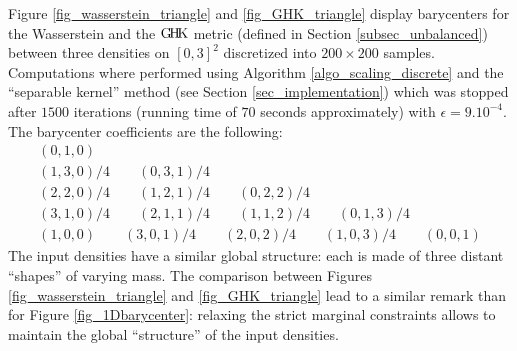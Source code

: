Figure \ref{fig_wasserstein_triangle} and \ref{fig_GHK_triangle} display barycenters for the Wasserstein and the $\operatorname{G\! H\! K}$ metric (defined in Section \ref{subsec_unbalanced}) between three densities on $[0,3]^2$ discretized into $200\times 200$ samples. Computations where performed using Algorithm \ref{algo_scaling_discrete} and the ``separable kernel'' method (see Section \ref{sec_implementation}) which was stopped after $1500$ iterations (running time of $70$ seconds approximately) with $\epsilon=9.10^{-4}$. The barycenter coefficients are the following:
\begin{gather*}
(0,1,0)\\
(1,3,0)/4 \qquad (0,3,1)/4 \\
(2,2,0)/4 \qquad (1,2,1)/4 \qquad (0,2,2)/4 \\
(3,1,0)/4 \qquad (2,1,1)/4 \qquad (1,1,2)/4 \qquad (0,1,3)/4\\
(1,0,0)    \qquad (3,0,1)/4 \qquad (2,0,2)/4 \qquad (1,0,3)/4 \qquad (0,0,1)
\end{gather*}
The input densities have a similar global structure: each is made of three distant ``shapes'' of varying mass. The comparison between Figures  \ref{fig_wasserstein_triangle} and \ref{fig_GHK_triangle} lead to a similar remark than for Figure \ref{fig_1Dbarycenter}: relaxing the strict marginal constraints allows to maintain the global ``structure'' of the input densities.

